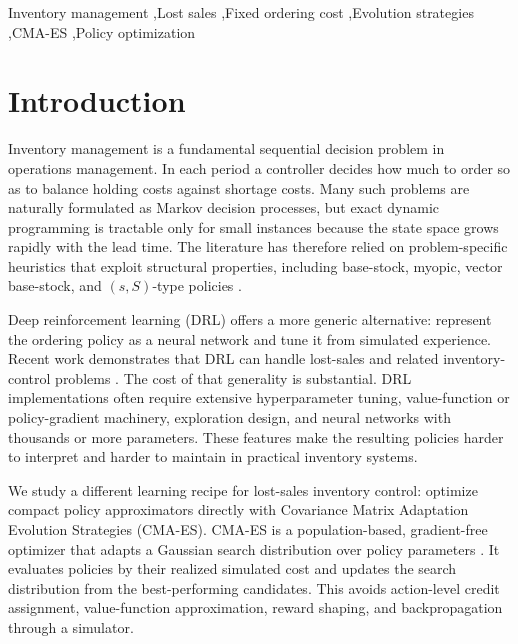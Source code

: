 \documentclass[authoryear,11pt]{elsarticle}
\begin{document}
\begin{frontmatter}
\begin{keyword}
Inventory management \sep Lost sales \sep Fixed ordering cost \sep Evolution strategies \sep CMA-ES \sep Policy optimization
\end{keyword}

\end{frontmatter}

\section{Introduction}
\label{sec:introduction}

Inventory management is a fundamental sequential decision problem in operations management. In each period a controller decides how much to order so as to balance holding costs against shortage costs. Many such problems are naturally formulated as Markov decision processes, but exact dynamic programming is tractable only for small instances because the state space grows rapidly with the lead time. The literature has therefore relied on problem-specific heuristics that exploit structural properties, including base-stock, myopic, vector base-stock, and $(s,S)$-type policies \citep{Zipkin2008OldSystems,Xin2021CappedBaseStock,Bijvank2015ParametricPolicies}.

Deep reinforcement learning (DRL) offers a more generic alternative: represent the ordering policy as a neural network and tune it from simulated experience. Recent work demonstrates that DRL can handle lost-sales and related inventory-control problems \citep{gijsbrechts2022drl,boute2022deep}. The cost of that generality is substantial. DRL implementations often require extensive hyperparameter tuning, value-function or policy-gradient machinery, exploration design, and neural networks with thousands or more parameters. These features make the resulting policies harder to interpret and harder to maintain in practical inventory systems.

We study a different learning recipe for lost-sales inventory control: optimize compact policy approximators directly with Covariance Matrix Adaptation Evolution Strategies (CMA-ES). CMA-ES is a population-based, gradient-free optimizer that adapts a Gaussian search distribution over policy parameters \citep{Hansen2001CompletelyStrategies,Salimans2017EvolutionLearning}. It evaluates policies by their realized simulated cost and updates the search distribution from the best-performing candidates. This avoids action-level credit assignment, value-function approximation, reward shaping, and backpropagation through a simulator.
\end{document}
